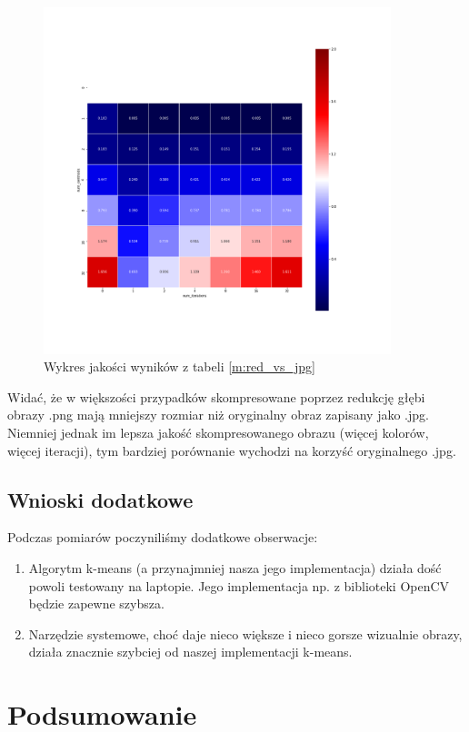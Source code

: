 \begin{figure}[H]
	\includegraphics[width=0.9\textwidth]{photos/plots/red_vs_jpg}
    \caption{Wykres jakości wyników z tabeli \ref{m:red_vs_jpg}}
\end{figure}

Widać, że w większości przypadków skompresowane poprzez redukcję głębi obrazy .png mają mniejszy rozmiar niż oryginalny obraz zapisany jako .jpg. Niemniej jednak im lepsza jakość skompresowanego obrazu (więcej kolorów, więcej iteracji), tym bardziej porównanie wychodzi na korzyść oryginalnego .jpg.

\subsection{Wnioski dodatkowe}

Podczas pomiarów poczyniliśmy dodatkowe obserwacje:
\begin{enumerate}
\item Algorytm k-means (a przynajmniej nasza jego implementacja) działa dość powoli testowany na laptopie. Jego implementacja np. z biblioteki OpenCV będzie zapewne szybsza.
\item Narzędzie systemowe, choć daje nieco większe i nieco gorsze wizualnie obrazy, działa znacznie szybciej od naszej implementacji k-means.
\end{enumerate}

\section{Podsumowanie}

